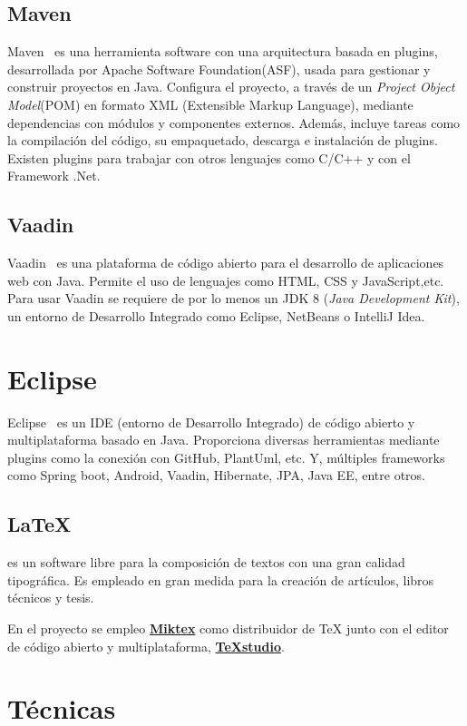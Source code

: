 \subsection{Maven}
Maven~\cite{pagina_maven} es una herramienta software con una arquitectura basada en plugins, desarrollada por Apache Software Foundation(ASF), usada para gestionar y construir proyectos en Java. Configura el proyecto, a través de un \emph{Project Object Model}(POM) en formato XML (Extensible Markup Language), mediante dependencias con módulos y componentes externos. Además, incluye tareas como la compilación del código, su empaquetado, descarga e instalación de plugins. Existen plugins para trabajar con otros lenguajes como C/C++ y con el Framework .Net. 

\subsection{Vaadin}
Vaadin~\cite{pagina_vaadin} es una plataforma de código abierto para el desarrollo de aplicaciones web con Java. Permite el uso de lenguajes como HTML, CSS y JavaScript,etc.
Para usar Vaadin se requiere de por lo menos un JDK 8 (\textit{Java Development Kit}), un entorno de Desarrollo Integrado como Eclipse, NetBeans o IntelliJ Idea.

\section{Eclipse}
Eclipse~\cite{pagina_eclipse} es un IDE (entorno de Desarrollo Integrado) de código abierto y multiplataforma basado en Java. Proporciona diversas herramientas mediante plugins como la conexión con GitHub, PlantUml, etc. Y, múltiples frameworks como Spring boot, Android, Vaadin, Hibernate, JPA, Java EE, entre otros.

\subsection{LaTeX} es un software libre para la composición de textos con una gran calidad tipográfica. Es empleado en gran medida para la creación de artículos, libros técnicos y tesis. 

En el proyecto se empleo \textbf{\href{https://miktex.org/}{Miktex}} como distribuidor de TeX junto con el editor de código abierto y multiplataforma, \textbf{\href{https://www.texstudio.org/}{TeXstudio}}. 

\section{Técnicas}

